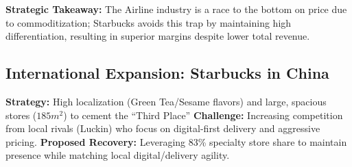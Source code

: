 \textbf{Strategic Takeaway:} The Airline industry is a race to the bottom on price due
to commoditization; Starbucks avoids this trap by maintaining high
differentiation, resulting in superior margins despite lower total revenue.

\subsection{International Expansion: Starbucks in China}
\textbf{Strategy:} High localization (Green Tea/Sesame flavors) and large, spacious
stores ($185m^2$) to cement the ``Third Place''
\textbf{Challenge:} Increasing competition from local rivals (Luckin) who focus on
digital-first delivery and aggressive pricing.
\textbf{Proposed Recovery:} Leveraging 83\% specialty store share to maintain presence
while matching local digital/delivery agility.